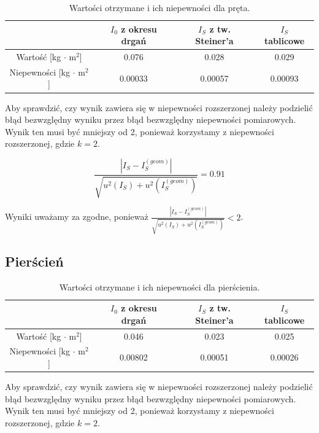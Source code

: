 \documentclass[a4paper,12pts]{article}
\begin{document}
		\begin{table}[!h]
		\centering
		\begin{tabular}{ | c | c | c | c | }
			\hline
			\textrm{ } & $I_0$ z okresu drgań & $I_S$ z tw. Steiner'a & $I_S$ tablicowe \\ \hline
			Wartość [kg $\cdot$ m$^2$] & 0.076 & 0.028 & 0.029 \\ \hline
			Niepewności [kg $\cdot$ m$^2$] & 0.00033 & 0.00057 & 0.00093 \\ \hline

		\end{tabular}
		\caption{Wartości otrzymane i ich niepewności dla pręta.}
		\label{Tabela5}	
	\end{table}

	Aby sprawdzić, czy wynik zawiera się w niepewności rozszerzonej należy podzielić błąd bezwzględny wyniku przez błąd bezwzględny niepewności pomiarowych. Wynik ten musi być mniejszy od 2, ponieważ korzystamy z niepewności rozszerzonej, gdzie $k = 2$.

	$$\frac{|I_S - I_S^{(geom)}|}{\sqrt{u^2(I_S) + u^2(I_S^{(geom)})}} = 0.91$$
	
	Wyniki uważamy za zgodne, ponieważ $\frac{|I_S - I_S^{(geom)}|}{\sqrt{u^2(I_S) + u^2(I_S^{(geom)})}} < 2$. 
	
	\newpage
	\subsection{Pierścień}
	
	\begin{table}[!h]
		\centering
		\begin{tabular}{ | c | c | c | c | }
			\hline
			\textrm{ } & $I_0$ z okresu drgań & $I_S$ z tw. Steiner'a & $I_S$ tablicowe \\ \hline
			Wartość [kg $\cdot$ m$^2$] & 0.046 & 0.023 & 0.025 \\ \hline
			Niepewności [kg $\cdot$ m$^2$] & 0.00802 & 0.00051 & 0.00026 \\ \hline
			
		\end{tabular}
		\caption{Wartości otrzymane i ich niepewności dla pierścienia.}
		\label{Tabela6}	
	\end{table}	

	Aby sprawdzić, czy wynik zawiera się w niepewności rozszerzonej należy podzielić błąd bezwzględny wyniku przez błąd bezwzględny niepewności pomiarowych. Wynik ten musi być mniejszy od 2, ponieważ korzystamy z niepewności rozszerzonej, gdzie $k = 2$.
\end{document}
